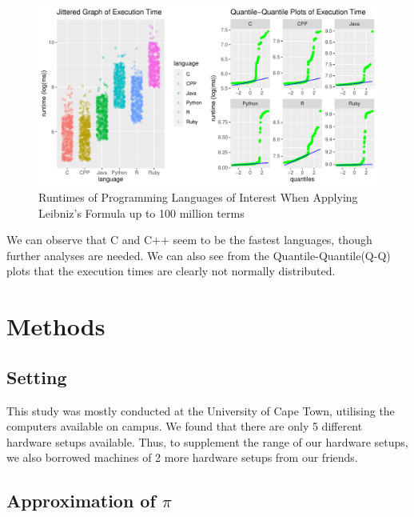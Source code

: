 \documentclass[12pt,halfline,a4paper,]{ouparticle}
\begin{document}
\begin{figure}[H]
\includegraphics[width=1\linewidth]{skeleton_files/figure-latex/figPrior-1} \caption{Runtimes of Programming Languages of Interest When Applying Leibniz's Formula up to 100 million terms}\label{fig:figPrior}
\end{figure}

We can observe that C and C++ seem to be the fastest languages, though
further analyses are needed. We can also see from the
Quantile-Quantile(Q-Q) plots that the execution times are clearly not
normally distributed. \newpage

\hypertarget{methods}{%
\section{Methods}\label{methods}}

\hypertarget{setting}{%
\subsection{Setting}\label{setting}}

This study was mostly conducted at the University of Cape Town,
utilising the computers available on campus. We found that there are
only 5 different hardware setups available. Thus, to supplement the
range of our hardware setups, we also borrowed machines of 2 more
hardware setups from our friends.

\hypertarget{approximation-of-pi}{%
\subsection{\texorpdfstring{Approximation of
\(\pi\)}{Approximation of \textbackslash pi}}\label{approximation-of-pi}}
\end{document}
